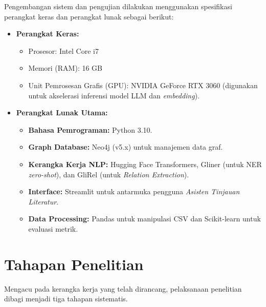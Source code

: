 Pengembangan sistem dan pengujian dilakukan menggunakan spesifikasi perangkat keras dan perangkat lunak sebagai berikut:

\begin{itemize}
    \item \textbf{Perangkat Keras:}
    \begin{itemize}
        \item Prosesor: Intel Core i7
        \item Memori (RAM): 16 GB
        \item Unit Pemrosesan Grafis (GPU): NVIDIA GeForce RTX 3060 (digunakan untuk akselerasi inferensi model LLM dan \textit{embedding}).
    \end{itemize}
    
    \item \textbf{Perangkat Lunak Utama:}
    \begin{itemize}
        \item \textbf{Bahasa Pemrograman:} Python 3.10.
        \item \textbf{Graph Database:} Neo4j (v5.x) untuk manajemen data graf.
        \item \textbf{Kerangka Kerja NLP:} Hugging Face Transformers, Gliner (untuk NER \textit{zero-shot}), dan GliRel (untuk \textit{Relation Extraction}).
        \item \textbf{Interface:} Streamlit untuk antarmuka pengguna \textit{Asisten Tinjauan Literatur}.
        \item \textbf{Data Processing:} Pandas untuk manipulasi CSV dan Scikit-learn untuk evaluasi metrik.
    \end{itemize}
\end{itemize}

\section{Tahapan Penelitian}
\label{sec:tahapan-penelitian}

Mengacu pada kerangka kerja yang telah dirancang, pelaksanaan penelitian dibagi menjadi tiga tahapan sistematis.

